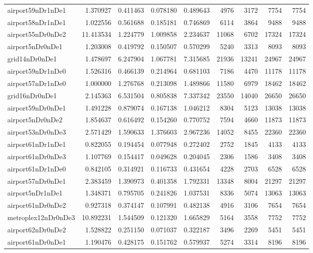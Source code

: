 \begin{longtable}{|l|r|r|r|r|r|r|r|r|}
airport59nDr1nDe1 & 1.370927 & 0.411463 & 0.078180 & 0.489643 & 4976 & 3172 & 7754 & 7754 \\
airport58nDr1nDe1 & 1.022556 & 0.561688 & 0.185181 & 0.746869 & 6114 & 3864 & 9488 & 9488 \\
airport55nDr0nDe2 & 11.413534 & 1.224779 & 1.009858 & 2.234637 & 11068 & 6702 & 17324 & 17324 \\
airport5nDr0nDe1 & 1.203008 & 0.419792 & 0.150507 & 0.570299 & 5240 & 3313 & 8093 & 8093 \\
grid14nDr0nDe1 & 1.478697 & 6.247904 & 1.067781 & 7.315685 & 21936 & 13241 & 24967 & 24967 \\
airport59nDr1nDe0 & 1.526316 & 0.466139 & 0.214964 & 0.681103 & 7186 & 4470 & 11178 & 11178 \\
airport57nDr1nDe0 & 1.000000 & 1.276768 & 0.213098 & 1.489866 & 11580 & 6979 & 18462 & 18462 \\
grid16nDr0nDe1 & 2.145363 & 6.531504 & 0.805838 & 7.337342 & 23550 & 14040 & 26650 & 26650 \\
airport59nDr0nDe1 & 1.491228 & 0.879074 & 0.167138 & 1.046212 & 8304 & 5123 & 13038 & 13038 \\
airport5nDr0nDe2 & 1.854637 & 0.616492 & 0.154260 & 0.770752 & 7594 & 4660 & 11873 & 11873 \\
airport53nDr0nDe3 & 2.571429 & 1.590633 & 1.376603 & 2.967236 & 14052 & 8455 & 22360 & 22360 \\
airport61nDr1nDe1 & 0.822055 & 0.194454 & 0.077948 & 0.272402 & 2752 & 1845 & 4133 & 4133 \\
airport61nDr0nDe3 & 1.107769 & 0.154417 & 0.049628 & 0.204045 & 2306 & 1586 & 3408 & 3408 \\
airport61nDr1nDe0 & 0.842105 & 0.314921 & 0.116733 & 0.431654 & 4228 & 2703 & 6528 & 6528 \\
airport57nDr0nDe1 & 2.383459 & 1.390973 & 0.401358 & 1.792331 & 13348 & 8004 & 21297 & 21297 \\
airport5nDr1nDe1 & 1.348371 & 0.795705 & 0.241826 & 1.037531 & 8336 & 5074 & 13063 & 13063 \\
airport61nDr0nDe2 & 0.927318 & 0.374147 & 0.107991 & 0.482138 & 4916 & 3106 & 7654 & 7654 \\
metroplex12nDr0nDe3 & 10.892231 & 1.544509 & 0.121320 & 1.665829 & 5164 & 3558 & 7752 & 7752 \\
airport62nDr0nDe2 & 1.528822 & 0.251150 & 0.071037 & 0.322187 & 3496 & 2269 & 5451 & 5451 \\
airport61nDr0nDe1 & 1.190476 & 0.428175 & 0.151762 & 0.579937 & 5274 & 3314 & 8196 & 8196 \\

\end{longtable}
